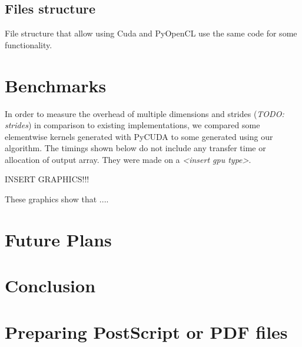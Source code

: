 \documentclass{article} %
\begin{document}
\subsection{Files structure}
File structure that allow using Cuda and PyOpenCL use the same code for some functionality.

\section{Benchmarks}

In order to measure the overhead of multiple dimensions and strides (\emph{TODO: strides}) in comparison to existing implementations, we compared some elementwise kernels generated with PyCUDA to some generated using our algorithm.  The timings shown below do not include any transfer time or allocation of output array.  They were made on a \emph{<insert gpu type>}.

INSERT GRAPHICS!!!

These graphics show that ....

\section{Future Plans}
\section{Conclusion}


\section{Preparing PostScript or PDF files}

% 
% 
\end{document}
